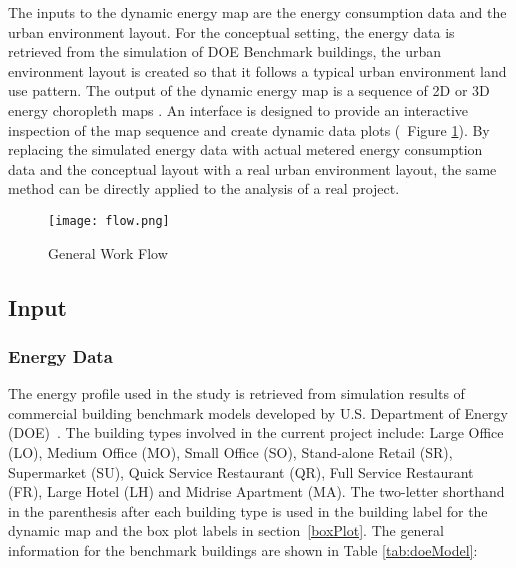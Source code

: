 \documentclass[hidelinks,12pt]{article}
\newcommand{\fref}[1]{Figure \ref{#1}}
\newcommand{\tref}[1]{Table \ref{#1}}
\begin{document}
The inputs to the dynamic energy map are the energy consumption data
and the urban environment layout. For the conceptual setting, the
energy data is retrieved from the simulation of DOE Benchmark
buildings, the urban environment layout is created so that it follows
a typical urban environment land use pattern. The output of the
dynamic energy map is a sequence of 2D or 3D energy choropleth maps
. An interface is designed to provide an interactive inspection of the
map sequence and create dynamic data plots (~\fref{fig:flow}). By
replacing the simulated energy data with actual metered energy
consumption data and the conceptual layout with a real urban
environment layout, the same method can be directly applied to the
analysis of a real project.

\begin{figure}[htbp]
  \centering
  \texttt{[image: flow.png]}
  \caption{General Work Flow}
  \label{fig:flow}
\end{figure}

\subsection{Input}
\subsubsection{Energy Data}
The energy profile used in the study is retrieved from simulation
results of commercial building benchmark models developed by
U.S. Department of Energy (DOE)~\cite{DOE2015}. The building types
involved in the current project include: Large Office (LO), Medium
Office (MO), Small Office (SO), Stand-alone Retail (SR), Supermarket
(SU), Quick Service Restaurant (QR), Full Service Restaurant (FR),
Large Hotel (LH) and Midrise Apartment (MA). The two-letter shorthand
in the parenthesis after each building type is used in the building
label for the dynamic map and the box plot labels in
section~\ref{boxPlot}. The general information for the benchmark
buildings are shown in \tref{tab:doeModel}:
\end{document}

